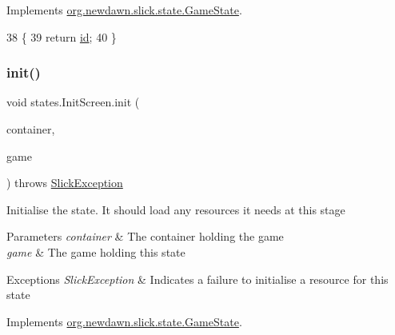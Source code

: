 Implements \mbox{\hyperlink{interfaceorg_1_1newdawn_1_1slick_1_1state_1_1_game_state_a54f2bc6a91feaf0614a5ef19f1d03313}{org.\+newdawn.\+slick.\+state.\+Game\+State}}.


\begin{DoxyCode}
38                        \{
39         \textcolor{keywordflow}{return} \mbox{\hyperlink{classstates_1_1_init_screen_a87ad48b02237b484fef3e4f22393eec9}{id}};
40     \}
\end{DoxyCode}
\mbox{\label{classstates_1_1_init_screen_aaf434e33dbe6466006ef3693e1140c7c}} 
\subsubsection{\texorpdfstring{init()}{init()}}
{\footnotesize\ttfamily void states.\+Init\+Screen.\+init (\begin{DoxyParamCaption}\item[{\mbox{\hyperlink{classorg_1_1newdawn_1_1slick_1_1_game_container}{Game\+Container}}}]{container,  }\item[{\mbox{\hyperlink{classorg_1_1newdawn_1_1slick_1_1state_1_1_state_based_game}{State\+Based\+Game}}}]{game }\end{DoxyParamCaption}) throws \mbox{\hyperlink{classorg_1_1newdawn_1_1slick_1_1_slick_exception}{Slick\+Exception}}\hspace{0.3cm}{\ttfamily [inline]}}

Initialise the state. It should load any resources it needs at this stage


\begin{DoxyParams}{Parameters}
{\em container} & The container holding the game \\
\hline
{\em game} & The game holding this state \\
\hline
\end{DoxyParams}

\begin{DoxyExceptions}{Exceptions}
{\em Slick\+Exception} & Indicates a failure to initialise a resource for this state \\
\hline
\end{DoxyExceptions}


Implements \mbox{\hyperlink{interfaceorg_1_1newdawn_1_1slick_1_1state_1_1_game_state_aa799a369e0fcfe6822d2d586fa6f5bbc}{org.\+newdawn.\+slick.\+state.\+Game\+State}}.


